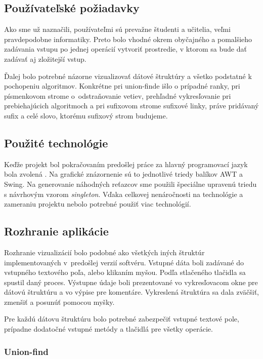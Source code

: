 \subsection{Používateľské požiadavky}

Ako sme už naznačili, používateľmi sú prevažne študenti a učitelia, veľmi 
pravdepodobne informatiky. Preto bolo vhodné okrem obyčajného a pomalšieho 
zadávania vstupu po jednej operácií vytvoriť prostredie, v ktorom sa bude dať 
zadávať aj zložitejší vstup.

Ďalej bolo potrebné názorne vizualizovať dátové štruktúry a všetko podstatné k 
pochopeniu algoritmov. Konkrétne pri union-finde išlo o prípadné ranky, 
pri písmenkovom strome o~odstraňovanie vetiev, prehľadné vykresľovanie pri 
prebiehajúcich algoritmoch a pri sufixovom strome sufixové linky, práve 
pridávaný sufix a celé slovo, ktorému sufixový strom budujeme.

\subsection{Použité technológie}

Keďže projekt bol pokračovaním predošlej práce za hlavný programovací jazyk 
bola zvolená \Java. Na grafické znázornenie sú to jednotlivé triedy balíkov 
AWT a Swing. Na generovanie náhodných reťazcov sme použili špeciálne upravenú 
triedu s návrhovým vzorom \emph{singleton}. Vďaka celkovej nenáročnosti na 
technológie a zameraniu projektu nebolo potrebné použiť viac technológií.

\subsection{Rozhranie aplikácie}

Rozhranie vizualizácií bolo podobné ako všetkých iných štruktúr 
implementovaných v~predošlej verzií softvéru. Vstupné dáta boli zadávané do 
vstupného textového poľa, alebo klikaním myšou. Podľa stlačeného tlačidla sa 
spustil daný proces. Výstupne údaje boli prezentované vo vykresľovacom okne 
pre dátovú štruktúru a vo výpise pre komentáre. Vykreslená štruktúra sa dala 
zväčšiť, zmenšiť a posunúť pomocou myšky.

Pre každú dátovu štruktúru bolo potrebné zabezpečiť vstupné textové pole, 
prípadne dodatočné vstupné metódy a tlačidlá pre všetky operácie.

\subsubsection{Union-find}

